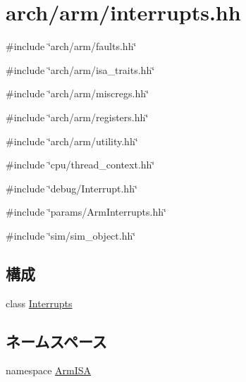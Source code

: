 \hypertarget{arm_2interrupts_8hh}{
\section{arch/arm/interrupts.hh}
\label{arm_2interrupts_8hh}
}
{\ttfamily \#include \char`\"{}arch/arm/faults.hh\char`\"{}}\par
{\ttfamily \#include \char`\"{}arch/arm/isa\_\-traits.hh\char`\"{}}\par
{\ttfamily \#include \char`\"{}arch/arm/miscregs.hh\char`\"{}}\par
{\ttfamily \#include \char`\"{}arch/arm/registers.hh\char`\"{}}\par
{\ttfamily \#include \char`\"{}arch/arm/utility.hh\char`\"{}}\par
{\ttfamily \#include \char`\"{}cpu/thread\_\-context.hh\char`\"{}}\par
{\ttfamily \#include \char`\"{}debug/Interrupt.hh\char`\"{}}\par
{\ttfamily \#include \char`\"{}params/ArmInterrupts.hh\char`\"{}}\par
{\ttfamily \#include \char`\"{}sim/sim\_\-object.hh\char`\"{}}\par
\subsection*{構成}
\begin{DoxyCompactItemize}
\item 
class \hyperlink{classArmISA_1_1Interrupts}{Interrupts}
\end{DoxyCompactItemize}
\subsection*{ネームスペース}
\begin{DoxyCompactItemize}
\item 
namespace \hyperlink{namespaceArmISA}{ArmISA}
\end{DoxyCompactItemize}
